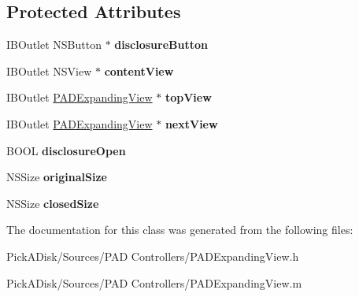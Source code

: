 \subsection*{Protected Attributes}
\begin{DoxyCompactItemize}
\item 
\hypertarget{interface_p_a_d_expanding_view_ab6fe622753ce5a47353666014950e962}{
IBOutlet NSButton $\ast$ {\bfseries disclosureButton}}
\label{interface_p_a_d_expanding_view_ab6fe622753ce5a47353666014950e962}

\item 
\hypertarget{interface_p_a_d_expanding_view_a7bd58b8cb3edc7480b466797235c4f41}{
IBOutlet NSView $\ast$ {\bfseries contentView}}
\label{interface_p_a_d_expanding_view_a7bd58b8cb3edc7480b466797235c4f41}

\item 
\hypertarget{interface_p_a_d_expanding_view_a6c74f422e1acac2bbb94047ccd28b8af}{
IBOutlet \hyperlink{interface_p_a_d_expanding_view}{PADExpandingView} $\ast$ {\bfseries topView}}
\label{interface_p_a_d_expanding_view_a6c74f422e1acac2bbb94047ccd28b8af}

\item 
\hypertarget{interface_p_a_d_expanding_view_a80f9f49e834c33c7f3fed7ec923cf422}{
IBOutlet \hyperlink{interface_p_a_d_expanding_view}{PADExpandingView} $\ast$ {\bfseries nextView}}
\label{interface_p_a_d_expanding_view_a80f9f49e834c33c7f3fed7ec923cf422}

\item 
\hypertarget{interface_p_a_d_expanding_view_aea704e86de9f7c33c6083ebfb4fdefb6}{
BOOL {\bfseries disclosureOpen}}
\label{interface_p_a_d_expanding_view_aea704e86de9f7c33c6083ebfb4fdefb6}

\item 
\hypertarget{interface_p_a_d_expanding_view_a38a9d2fb9949a533269a21e84a3aaafb}{
NSSize {\bfseries originalSize}}
\label{interface_p_a_d_expanding_view_a38a9d2fb9949a533269a21e84a3aaafb}

\item 
\hypertarget{interface_p_a_d_expanding_view_a6540694b10a31b6f6bf18afd3d7d40e2}{
NSSize {\bfseries closedSize}}
\label{interface_p_a_d_expanding_view_a6540694b10a31b6f6bf18afd3d7d40e2}

\end{DoxyCompactItemize}


The documentation for this class was generated from the following files:\begin{DoxyCompactItemize}
\item 
PickADisk/Sources/PAD Controllers/PADExpandingView.h\item 
PickADisk/Sources/PAD Controllers/PADExpandingView.m\end{DoxyCompactItemize}
